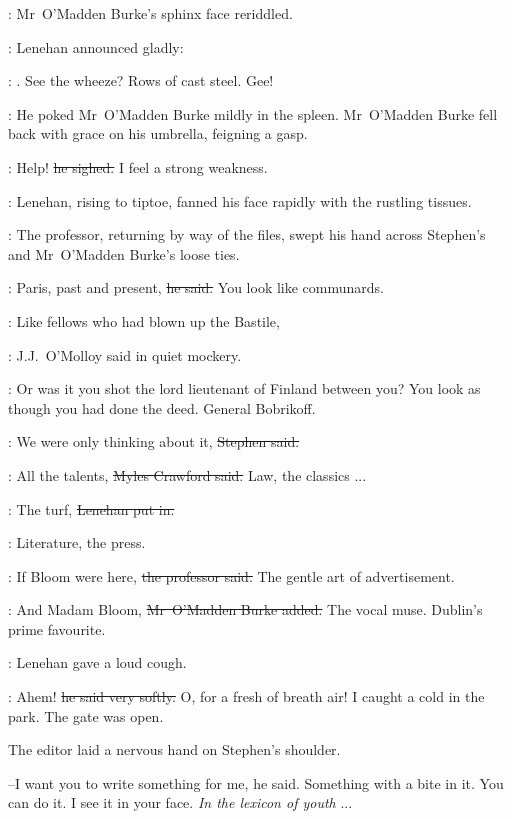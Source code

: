:
Mr~O'Madden Burke's sphinx face reriddled.

:
Lenehan announced gladly:

\lenehan:
.
See the wheeze?
Rows of cast steel.
Gee!

:
He poked Mr~O'Madden Burke mildly in the spleen.
Mr~O'Madden Burke fell back with grace on his umbrella,
feigning a gasp.

\omaddenburke:
Help!
\sout{he sighed.}
I feel a strong weakness.

:
Lenehan,
rising to tiptoe,
fanned his face rapidly with the rustling tissues.

:
The professor,
returning by way of the files,
swept his hand across Stephen's and Mr~O'Madden Burke's loose ties.

\machugh:
Paris, past and present,
\sout{he said.}
You look like communards.

\jjom:
Like fellows who had blown up the Bastile,

:
J.J.~O'Molloy said in quiet mockery.

\jjom:
Or was it you shot the lord lieutenant of Finland between you?
You look as though you had done the deed.
General Bobrikoff.



\Stephen:
We were only thinking about it,
\sout{Stephen said.}

\crawford:
All the talents,
\sout{Myles Crawford said.}
Law,
the classics ...

\lenehan:
The turf,
\sout{Lenehan put in.}

\crawford:
Literature,
the press.

\machugh:
If Bloom were here,
\sout{the professor said.}
The gentle art of advertisement.

\omaddenburke:
And Madam Bloom,
\sout{Mr~O'Madden Burke added.}
The vocal muse.
Dublin's prime favourite.

:
Lenehan gave a loud cough.

\lenehan:
Ahem!
\sout{he said very softly.}
O, for a fresh of breath air!
I caught a cold in the park.
The gate was open.



The editor laid a nervous hand on Stephen's shoulder.

--I want you to write something for me,
he said.
Something with a bite in it.
You can do it.
I see it in your face.
\emph{In the lexicon of youth} ...

